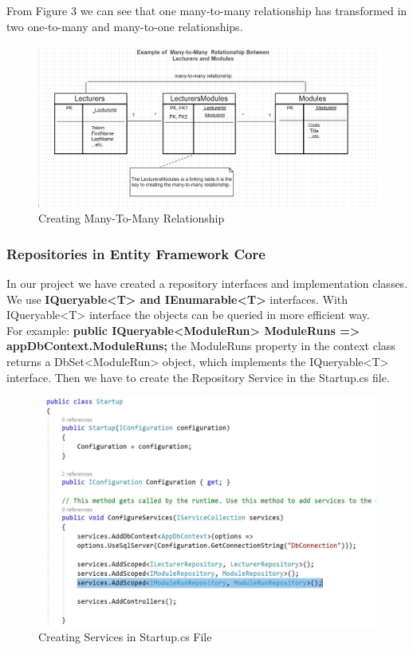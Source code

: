 \documentclass{scrartcl}
\begin{document}
From Figure 3 we can see that one many-to-many relationship has transformed in two one-to-many and many-to-one relationships.

\begin{figure}[H]
\centering
\includegraphics[width=150mm]{report_img/many-to-many-tables.JPG}
\caption{Creating Many-To-Many Relationship}
\label{blabla}
\end{figure}


\subsubsection{Repositories in Entity Framework Core}
In our project we have created a repository interfaces and implementation classes.\\
We use \textbf{IQueryable<T> and IEnumarable<T>} interfaces.
With IQueryable<T> interface the objects can be queried in more efficient way.\\
For example: \textbf{public IQueryable<ModuleRun> ModuleRuns => appDbContext.ModuleRuns;} the ModuleRuns property in the context class returns a DbSet<ModuleRun> object, which implements the IQueryable<T> interface.
Then we have to  create the Repository Service in the Startup.cs file.\\

\begin{figure}[h]
\centering
\includegraphics[width=150mm]{report_img/add_scoped_rep.JPG}
\caption{Creating Services in Startup.cs File}
\label{blabla}
\end{figure}
\end{document}
